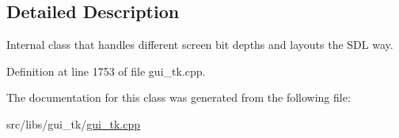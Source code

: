 \subsection{Detailed Description}
Internal class that handles different screen bit depths and layouts the S\-D\-L way. 

Definition at line 1753 of file gui\-\_\-tk.\-cpp.



The documentation for this class was generated from the following file\-:\begin{DoxyCompactItemize}
\item 
src/libs/gui\-\_\-tk/\hyperlink{gui__tk_8cpp}{gui\-\_\-tk.\-cpp}\end{DoxyCompactItemize}
